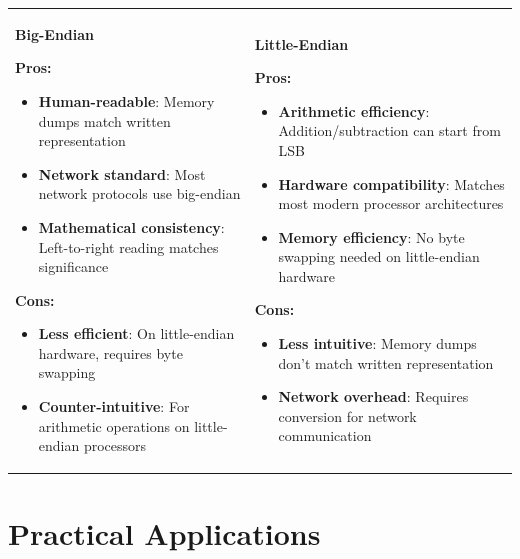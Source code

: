 \documentclass[11pt,a4paper]{article}
\begin{document}
\begin{center}
\begin{tabular}{p{}p{}}
\begin{prosbox}
\textbf{Big-Endian}

\textbf{Pros:}
\begin{itemize}
    \item \textbf{Human-readable}: Memory dumps match written representation
    \item \textbf{Network standard}: Most network protocols use big-endian
    \item \textbf{Mathematical consistency}: Left-to-right reading matches significance
\end{itemize}

\textbf{Cons:}
\begin{itemize}
    \item \textbf{Less efficient}: On little-endian hardware, requires byte swapping
    \item \textbf{Counter-intuitive}: For arithmetic operations on little-endian processors
\end{itemize}
\end{prosbox}
&
\begin{consbox}
\textbf{Little-Endian}

\textbf{Pros:}
\begin{itemize}
    \item \textbf{Arithmetic efficiency}: Addition/subtraction can start from LSB
    \item \textbf{Hardware compatibility}: Matches most modern processor architectures
    \item \textbf{Memory efficiency}: No byte swapping needed on little-endian hardware
\end{itemize}

\textbf{Cons:}
\begin{itemize}
    \item \textbf{Less intuitive}: Memory dumps don't match written representation
    \item \textbf{Network overhead}: Requires conversion for network communication
\end{itemize}
\end{consbox}
\end{tabular}
\end{center}

\section{Practical Applications}
\end{document}
